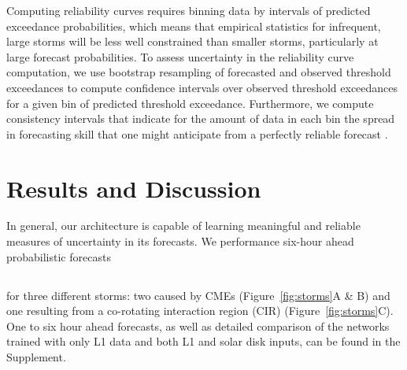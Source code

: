 \documentclass[draft,linenumbers]{agujournal2018}
\begin{document}
Computing reliability curves requires binning data by intervals of predicted exceedance probabilities, which means that empirical statistics for infrequent, large storms will be less well constrained than smaller storms, particularly at large forecast probabilities. To assess uncertainty in the reliability curve computation, we use bootstrap resampling of forecasted and observed threshold exceedances to compute confidence intervals over observed threshold exceedances for a given bin of predicted threshold exceedance. Furthermore, we compute consistency intervals that indicate for the amount of data in each bin the spread in forecasting skill that one might anticipate from a perfectly reliable forecast \citep{Brocker2007}.

\section{Results and Discussion}
% 
In general, our architecture is capable of learning meaningful and reliable measures of uncertainty in its forecasts. We  performance  six-hour ahead probabilistic forecasts    

\subsection{}
 for three different storms: two caused by CMEs (Figure~\ref{fig:storms}A \& B) and one resulting from a co-rotating interaction region (CIR) (Figure~\ref{fig:storms}C). One to six hour ahead forecasts, as well as detailed comparison of the networks trained with only L1 data and both L1 and solar disk inputs, can be found in the Supplement.
\end{document}
